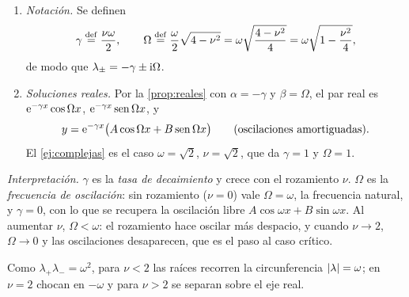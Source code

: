\begin{ejemplo}[$y''+\nu\omega\,y'+\omega^{2}y=0$, con $\nu\ge0$, $\omega>0$]
\begin{enumerate}[label=\textcolor{cian}{\arabic*.}, leftmargin=1.5em, itemsep=4pt]
\[        \]
  \item \emph{Notación.} Se definen
        \[
          \gamma\mathrel{\overset{\mathrm{def}}{=}}\frac{\nu\omega}{2},\qquad
          \Omega\mathrel{\overset{\mathrm{def}}{=}}\frac{\omega}{2}\sqrt{4-\nu^{2}}
                =\omega\sqrt{\frac{4-\nu^{2}}{4}}=\omega\sqrt{1-\frac{\nu^{2}}{4}},
        \]
        de modo que $\lambda_\pm=-\gamma\pm\mathrm{i}\Omega$.
  \item \emph{Soluciones reales.} Por la \cref{prop:reales} con $\alpha=-\gamma$ y
        $\beta=\Omega$, el par real es $\mathrm{e}^{-\gamma x}\cos\Omega x$,
        $\mathrm{e}^{-\gamma x}\operatorname{sen}\Omega x$, y
        \begin{equation}\label{eq:subamortiguado}
          y=\mathrm{e}^{-\gamma x}\bigl(A\cos\Omega x+B\operatorname{sen}\Omega x\bigr)
          \qquad\text{(oscilaciones amortiguadas)}.
        \end{equation}
        El \cref{ej:complejas} es el caso $\omega=\sqrt2$, $\nu=\sqrt2$, que da
        $\gamma=1$ y $\Omega=1$.
\end{enumerate}
\emph{Interpretación.} $\gamma$ es la \emph{tasa de decaimiento} y crece con el
rozamiento $\nu$. $\Omega$ es la \emph{frecuencia de oscilación}: sin rozamiento
($\nu=0$) vale $\Omega=\omega$, la frecuencia natural, y $\gamma=0$, con lo que
se recupera la oscilación libre $A\cos\omega x+B\sin\omega x$. Al aumentar
$\nu$, $\Omega<\omega$: el rozamiento hace oscilar más despacio, y cuando
$\nu\to2$, $\Omega\to0$ y las oscilaciones desaparecen, que es el paso al caso
crítico.

Como $\lambda_+\lambda_-=\omega^{2}$, para $\nu<2$ las raíces recorren la
circunferencia $\lvert \lambda\rvert=\omega$; en $\nu=2$ chocan en $-\omega$ y para
$\nu>2$ se separan sobre el eje real.
\end{ejemplo}


